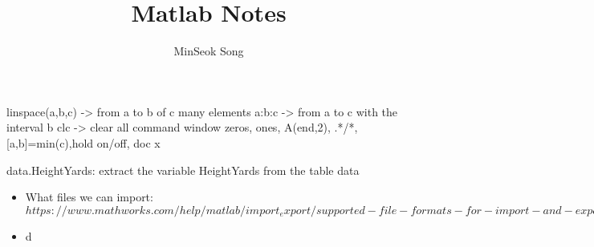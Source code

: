 \documentclass{article}
\title{Matlab Notes}
\author{MinSeok Song}
\date{}
\begin{document}
\maketitle
linspace(a,b,c) -> from a to b of c many elements
a:b:c -> from a to c with the interval b
clc -> clear all command window
zeros, ones, A(end,2), .*/*, [a,b]=min(c),hold on/off, doc x

data.HeightYards: extract the variable HeightYards from the table data
\begin{itemize}
\item What files we can import: $https://www.mathworks.com/help/matlab/import_export/supported-file-formats-for-import-and-export.html$

\item d 
\end{itemize}
\end{document}
